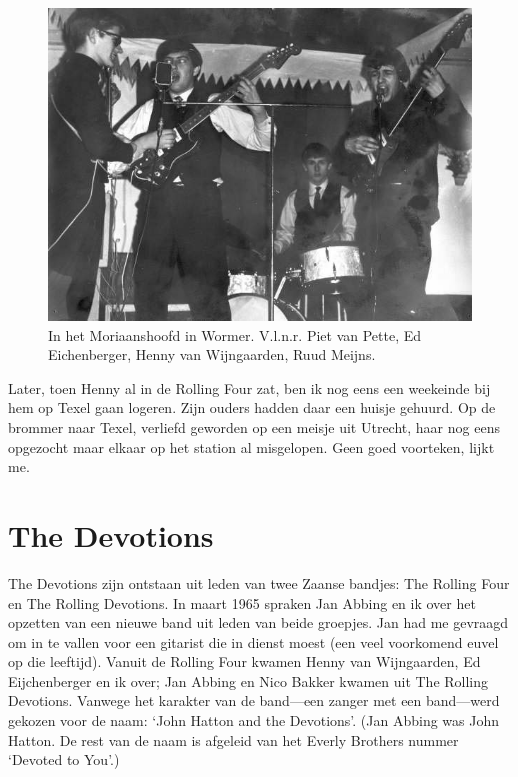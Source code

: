 \documentclass[10pt,twoside, openright]{memoir}
\begin{document}
\begin{figure}
\includegraphics[width=\textwidth]{img/ch26/rf-4-moriaan}
\caption*{\footnotesize In het Moriaanshoofd in Wormer. V.l.n.r. Piet van Pette, Ed Eichenberger, Henny van Wijngaarden, Ruud Meijns.}
\end{figure}

Later, toen Henny al in de Rolling Four zat, ben ik nog eens een weekeinde bij hem op Texel gaan logeren. Zijn ouders hadden daar een huisje gehuurd. Op de brommer naar Texel, verliefd geworden op een meisje uit Utrecht, haar nog eens opgezocht maar elkaar op het station al misgelopen. Geen goed voorteken, lijkt me.

\chapter{The Devotions} %
\label{cha:devotions}

The Devotions zijn ontstaan uit leden van twee Zaanse bandjes: The Rolling Four en The Rolling Devotions. In maart 1965 spraken Jan Abbing en ik over het opzetten van een nieuwe band uit leden van beide groepjes. Jan had me gevraagd om in te vallen voor een gitarist die in dienst moest (een veel voorkomend euvel op die leeftijd). Vanuit de Rolling Four kwamen Henny van Wijngaarden, Ed Eijchenberger en ik over; Jan Abbing en Nico Bakker kwamen uit The Rolling Devotions. Vanwege het karakter van de band---een zanger met een band---werd gekozen voor de naam: `John Hatton and the Devotions'. (Jan Abbing was John Hatton. De rest van de naam is afgeleid van het Everly Brothers nummer `Devoted to You'.)
\end{document}
